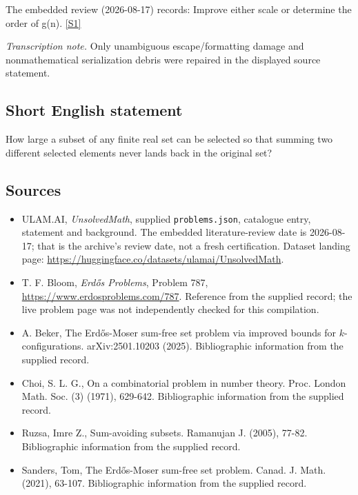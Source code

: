 \documentclass[11pt,a4paper]{article}
\newcommand{\sref}[2]{\hyperlink{source:#1:#2}{[S#2]}}
\begin{document}
The embedded review (2026-08-17) records: Improve either scale or determine the order of g(n). \sref{statement}{1}

{\small\emph{Transcription note.} Only unambiguous escape/formatting damage and nonmathematical serialization debris were repaired in the displayed source statement.}

\subsection{Short English statement}

How large a subset of any finite real set can be selected so that summing two different selected elements never lands back in the original set?

\subsection{Sources}

{\small

\begin{itemize}

\item[\hypertarget{source:statement:1}{S1}] ULAM.AI, \emph{UnsolvedMath}, supplied \texttt{problems.json}, catalogue entry, statement and background. The embedded literature-review date is 2026-08-17; that is the archive’s review date, not a fresh certification. Dataset landing page: \url{https://huggingface.co/datasets/ulamai/UnsolvedMath}.

\item[\hypertarget{source:statement:2}{S2}] T. F. Bloom, \emph{Erdős Problems}, Problem 787, \url{https://www.erdosproblems.com/787}. Reference from the supplied record; the live problem page was not independently checked for this compilation.

\item[\hypertarget{source:statement:3}{S3}] A. Beker, The Erd\H{o}s-Moser sum-free set problem via improved bounds for $k$-configurations. arXiv:2501.10203 (2025). Bibliographic information from the supplied record.

\item[\hypertarget{source:statement:4}{S4}] Choi, S. L. G., On a combinatorial problem in number theory. Proc. London Math. Soc. (3) (1971), 629-642. Bibliographic information from the supplied record.

\item[\hypertarget{source:statement:5}{S5}] Ruzsa, Imre Z., Sum-avoiding subsets. Ramanujan J. (2005), 77-82. Bibliographic information from the supplied record.

\item[\hypertarget{source:statement:6}{S6}] Sanders, Tom, The Erd\H{o}s-Moser sum-free set problem. Canad. J. Math. (2021), 63-107. Bibliographic information from the supplied record.

\end{itemize}

}

\label{end:statement}
\end{document}
